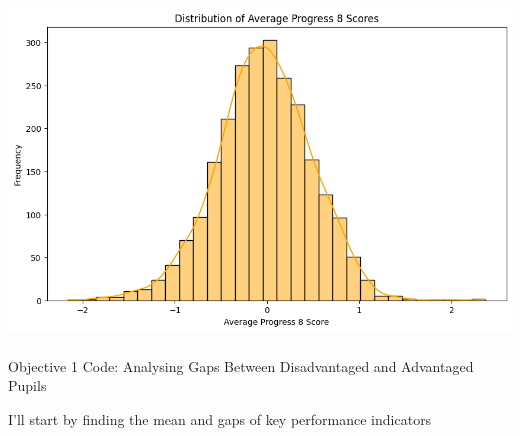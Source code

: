\documentclass[
  letterpaper,
  DIV=11,
  numbers=noendperiod]{scrartcl}
\makeatletter
\let\oldparagraph\paragraph
\renewcommand{\paragraph}{
    \@ifstar
      \xxxParagraphStar
      \xxxParagraphNoStar
  }
\newcommand{\xxxParagraphStar}[1]{\oldparagraph*{#1}\mbox{}}
\newcommand{\xxxParagraphNoStar}[1]{\oldparagraph{#1}\mbox{}}
\makeatother
\begin{document}
\includegraphics{P4DS_A2_Data_Analysis_Project_files/figure-pdf/cell-61-output-1.png}

\paragraph{Objective 1 Code: Analysing Gaps Between Disadvantaged and
Advantaged
Pupils}\label{objective-1-code-analysing-gaps-between-disadvantaged-and-advantaged-pupils}

I'll start by finding the mean and gaps of key performance indicators
\end{document}
